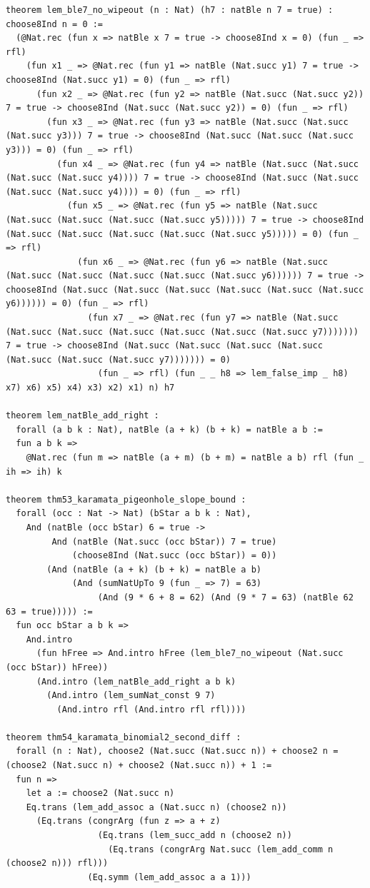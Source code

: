 \documentclass[11pt,letterpaper]{article}
\theoremstyle{spectralthm}
\begin{document}
\begin{lstlisting}[language=Lean4,caption={Standalone Pure Init.Prelude Term-Mode Lean 4 Kernel Suite (thm30--thm61, v0.0.0, 0 sorry, 0 axioms).},label={lst:lean_unified}]
theorem lem_ble7_no_wipeout (n : Nat) (h7 : natBle n 7 = true) : choose8Ind n = 0 :=
  (@Nat.rec (fun x => natBle x 7 = true -> choose8Ind x = 0) (fun _ => rfl)
    (fun x1 _ => @Nat.rec (fun y1 => natBle (Nat.succ y1) 7 = true -> choose8Ind (Nat.succ y1) = 0) (fun _ => rfl)
      (fun x2 _ => @Nat.rec (fun y2 => natBle (Nat.succ (Nat.succ y2)) 7 = true -> choose8Ind (Nat.succ (Nat.succ y2)) = 0) (fun _ => rfl)
        (fun x3 _ => @Nat.rec (fun y3 => natBle (Nat.succ (Nat.succ (Nat.succ y3))) 7 = true -> choose8Ind (Nat.succ (Nat.succ (Nat.succ y3))) = 0) (fun _ => rfl)
          (fun x4 _ => @Nat.rec (fun y4 => natBle (Nat.succ (Nat.succ (Nat.succ (Nat.succ y4)))) 7 = true -> choose8Ind (Nat.succ (Nat.succ (Nat.succ (Nat.succ y4)))) = 0) (fun _ => rfl)
            (fun x5 _ => @Nat.rec (fun y5 => natBle (Nat.succ (Nat.succ (Nat.succ (Nat.succ (Nat.succ y5))))) 7 = true -> choose8Ind (Nat.succ (Nat.succ (Nat.succ (Nat.succ (Nat.succ y5))))) = 0) (fun _ => rfl)
              (fun x6 _ => @Nat.rec (fun y6 => natBle (Nat.succ (Nat.succ (Nat.succ (Nat.succ (Nat.succ (Nat.succ y6)))))) 7 = true -> choose8Ind (Nat.succ (Nat.succ (Nat.succ (Nat.succ (Nat.succ (Nat.succ y6)))))) = 0) (fun _ => rfl)
                (fun x7 _ => @Nat.rec (fun y7 => natBle (Nat.succ (Nat.succ (Nat.succ (Nat.succ (Nat.succ (Nat.succ (Nat.succ y7))))))) 7 = true -> choose8Ind (Nat.succ (Nat.succ (Nat.succ (Nat.succ (Nat.succ (Nat.succ (Nat.succ y7))))))) = 0)
                  (fun _ => rfl) (fun _ _ h8 => lem_false_imp _ h8) x7) x6) x5) x4) x3) x2) x1) n) h7

theorem lem_natBle_add_right :
  forall (a b k : Nat), natBle (a + k) (b + k) = natBle a b :=
  fun a b k =>
    @Nat.rec (fun m => natBle (a + m) (b + m) = natBle a b) rfl (fun _ ih => ih) k

theorem thm53_karamata_pigeonhole_slope_bound :
  forall (occ : Nat -> Nat) (bStar a b k : Nat),
    And (natBle (occ bStar) 6 = true ->
         And (natBle (Nat.succ (occ bStar)) 7 = true)
             (choose8Ind (Nat.succ (occ bStar)) = 0))
        (And (natBle (a + k) (b + k) = natBle a b)
             (And (sumNatUpTo 9 (fun _ => 7) = 63)
                  (And (9 * 6 + 8 = 62) (And (9 * 7 = 63) (natBle 62 63 = true))))) :=
  fun occ bStar a b k =>
    And.intro
      (fun hFree => And.intro hFree (lem_ble7_no_wipeout (Nat.succ (occ bStar)) hFree))
      (And.intro (lem_natBle_add_right a b k)
        (And.intro (lem_sumNat_const 9 7)
          (And.intro rfl (And.intro rfl rfl))))

theorem thm54_karamata_binomial2_second_diff :
  forall (n : Nat), choose2 (Nat.succ (Nat.succ n)) + choose2 n = (choose2 (Nat.succ n) + choose2 (Nat.succ n)) + 1 :=
  fun n =>
    let a := choose2 (Nat.succ n)
    Eq.trans (lem_add_assoc a (Nat.succ n) (choose2 n))
      (Eq.trans (congrArg (fun z => a + z)
                  (Eq.trans (lem_succ_add n (choose2 n))
                    (Eq.trans (congrArg Nat.succ (lem_add_comm n (choose2 n))) rfl)))
                (Eq.symm (lem_add_assoc a a 1)))


\end{lstlisting}
\end{document}
